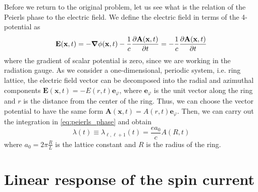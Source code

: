 Before we return to the original problem, let us see what is the relation of the Peierls phase to the electric field.
We define the electric field in terms of the 4-potential as
\begin{equation}
    \mathbf{E}(\mathbf{x},t) = -\grad{\phi(\mathbf{x},t)} - \frac{1}{c} \pdv{\mathbf{A}(\mathbf{x},t)}{t}
    = -\frac{1}{c} \pdv{\mathbf{A} (\mathbf{x},t)}{t}
\end{equation}
where the gradient of scalar potential is zero, since we are working in the radiation gauge.
As we consider a one-dimensional, periodic system, i.e. ring lattice, the electric field vector can be decomposed into
the radial and azimuthal components \(\mathbf{E} (\mathbf{x} ,t) = -E(r,t)\mathbf{e}_{\varphi}\), where
\(\mathbf{e}_{\varphi }\) is the unit vector along the ring and \(r\) is the distance from the center of the ring.
Thus, we can choose the vector potential to have the same form \(\mathbf{A}(\mathbf{x},t) = A(r,t)\mathbf{e}_{\varphi}\).
Then, we can carry out the integration in \eqref{eq:peierls_phase} and obtain
\begin{equation}
    \lambda(t) \equiv \lambda_{\ell,\ell+1}(t) = \frac{e a_0}{c} A(R,t)
\end{equation}
where \(a_0 = 2\pi \frac{R}{L}\) is the lattice constant and \(R\) is the radius of the ring.

\section{Linear response of the spin current}

